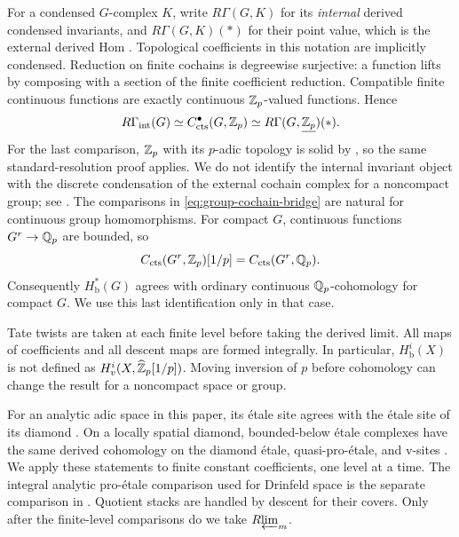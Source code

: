 For a condensed $G$-complex $K$, write $R\Gamma(G,K)$ for its
\emph{internal} derived condensed invariants, and $R\Gamma(G,K)(*)$
for their point value, which is the external derived Hom
\cite[\S2, p.~8]{Anschutz2020}.  Topological coefficients in this
notation are implicitly condensed.  Reduction on finite cochains is
degreewise surjective: a function lifts by composing with a section of
the finite coefficient reduction.  Compatible finite continuous
functions are exactly continuous $\mathbb Z_p$-valued functions.  Hence
\begin{equation}\label{eq:group-cochain-bridge}
 R\Gamma_{\mathrm{int}}(G)\simeq C_{\mathrm{cts}}^{\bullet}(G,\mathbb Z_p)
       \simeq R\Gamma(G,\underline{\mathbb Z_p})(*).
\end{equation}
For the last comparison, $\mathbb Z_p$ with its $p$-adic topology is solid by
\cite[\S1, pp.~4--5]{Anschutz2020}, so the same standard-resolution
proof applies.  We do not identify the internal invariant object with
the discrete condensation of the external cochain complex for a
noncompact group; see \cite[Lemma~2.5 and Remark~2.6]{Anschutz2020}.
The comparisons in \eqref{eq:group-cochain-bridge} are natural for
continuous group homomorphisms.
For compact $G$, continuous functions $G^r\to\mathbb Q_p$ are bounded, so
\[
 C_{\mathrm{cts}}(G^r,\mathbb Z_p)[1/p]=C_{\mathrm{cts}}(G^r,\mathbb Q_p).
\]
Consequently $H^*_{\mathrm b}(G)$ agrees with ordinary continuous
$\mathbb Q_p$-cohomology for compact $G$.  We use this last identification
only in that case.

Tate twists are taken at each finite level before taking the derived
limit.  All maps of coefficients and all descent maps are formed
integrally.  In particular, $H^i_{\mathrm b}(X)$ is not defined as
$H^i_v(X,\widehat{\mathbb Z}_p[1/p])$.  Moving inversion of $p$ before
cohomology can change the result for a noncompact space or group.

For an analytic adic space in this paper, its \'etale site agrees with
the \'etale site of its diamond
\cite[Lemma~15.6]{ScholzeDiamonds}. On a locally spatial diamond,
bounded-below \'etale complexes have the same derived cohomology on
the diamond \'etale, quasi-pro-\'etale, and v-sites
\cite[Proposition~14.10]{ScholzeDiamonds}. We apply these statements
to finite constant coefficients, one level at a time. The integral
analytic pro-\'etale comparison used for Drinfeld space is the
separate comparison in \cite[\S5]{CDN2021}. Quotient stacks are
handled by descent for their covers. Only after the finite-level
comparisons do we take $R\!\varprojlim_m$.


